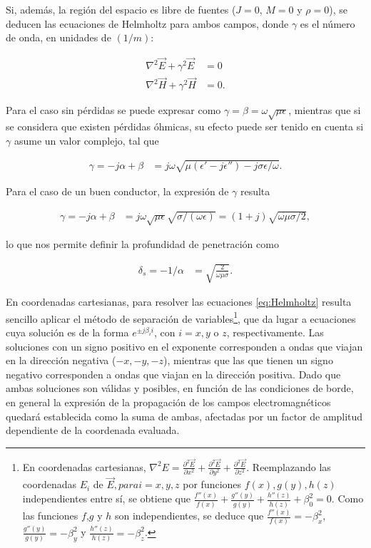 Si, además, la región del espacio es libre de fuentes ($J=0$, $M=0$ y $\rho=0$), se deducen las ecuaciones de Helmholtz para ambos campos, donde $\gamma$ es el número de onda, en unidades de $(1/m)$:

\begin{equation}
	\label{eq:Helmholtz}
	\begin{aligned}
		\nabla^2  \vec{E} + \gamma^2 \vec{E} &= 0  \\
		\nabla^2 \vec{H} + \gamma^2 \vec{H}& = 0. 
	\end{aligned}
\end{equation}

Para el caso sin pérdidas se puede expresar como $\gamma = \beta = \omega \sqrt{\mu \epsilon}$, mientras que si se considera que existen pérdidas óhmicas,  su efecto puede ser tenido en cuenta si  $\gamma$ asume un valor complejo, tal que

\begin{align}
\label{eq:constante-propagacion-compleja}
\gamma = -j\alpha + \beta &= j\omega \sqrt{\mu (\epsilon'-j\epsilon'') - j \sigma \epsilon/\omega}.
\end{align}

Para el caso de un buen conductor, la expresión de $\gamma$ resulta

\begin{align}
\gamma = -j\alpha + \beta &= j \omega \sqrt{\mu \epsilon} \sqrt{\sigma/(\omega \epsilon)} = (1+j) \sqrt{\omega \mu \sigma/2},
\end{align}

lo que nos permite definir la profundidad de penetración como 

\begin{align}
\delta_s = -1/\alpha &= \sqrt{\frac{2}{\omega \mu \sigma}}.
\end{align}

En coordenadas cartesianas, para resolver las ecuaciones \ref{eq:Helmholtz} resulta sencillo aplicar el método de separación de variables\footnote{En coordenadas cartesianas, $\nabla^2 E = \frac{\partial^2 \vec{E}}{\partial x^2} + \frac{\partial^2 \vec{E}}{\partial y^2} + \frac{\partial^2 \vec{E}}{\partial z^2}$. Reemplazando las coordenadas $E_i$ de $\vec{E}, para i=x,y,z$ por funciones $f(x),g(y),h(z)$ independientes entre sí, se obtiene que $\frac{f''(x)}{f(x)} + \frac{g''(y)}{g(y)} + \frac{h''(z)}{h(z)} + \beta_0^2 = 0$. Como las funciones $f$,$g$ y $h$ son independientes, se deduce que $\frac{f''(x)}{f(x)} = -\beta_x^2$, $\frac{g''(y)}{g(y)} = -\beta_y^2$ y $\frac{h''(z)}{h(z)} = -\beta_z^2$.}, que da lugar a ecuaciones cuya solución es de la forma $e^{\pm j \beta_i i}$, con $i = x, y$ o $z$, respectivamente. Las soluciones con un signo positivo en el exponente corresponden a ondas que viajan en la dirección negativa ($-x, -y, -z$), mientras que las que tienen un signo negativo corresponden a ondas que viajan en la dirección positiva. Dado que ambas soluciones son válidas y posibles, en función de las condiciones de borde, en general la expresión de la propagación de los campos electromagnéticos quedará establecida como la suma de ambas, afectadas por un factor de amplitud dependiente de la coordenada evaluada.

